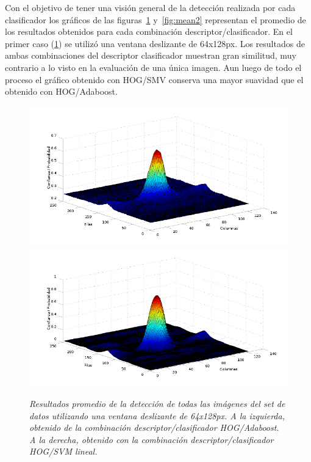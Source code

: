 Con el objetivo de tener una visión general de la detección realizada por cada clasificador los gráficos de las figuras~\ref{fig:mean1} y~\ref{fig:mean2} representan el promedio de los resultados obtenidos para cada combinación descriptor/clasificador.
En el primer caso (\ref{fig:mean1}) se utilizó una ventana deslizante de 64x128px. Los resultados de ambas combinaciones del descriptor clasificador muestran gran similitud, muy contrario a lo visto en la evaluación de una única imagen. Aun luego de todo el proceso el gráfico obtenido con HOG/SMV conserva una mayor suavidad que el obtenido con HOG/Adaboost. 

\begin{figure}[H]
  \centering
  \includegraphics[scale=.25]{images/mean/boost/64}
  \includegraphics[scale=.25]{images/mean/svm/64}
  \caption{\em  Resultados promedio de la detección de todas las imágenes del set de datos utilizando una ventana deslizante de 64x128px. A la izquierda, obtenido de la combinación descriptor/clasificador HOG/Adaboost. A la derecha, obtenido con la combinación descriptor/clasificador HOG/SVM lineal.}  
  \label{fig:mean1}
\end{figure}

